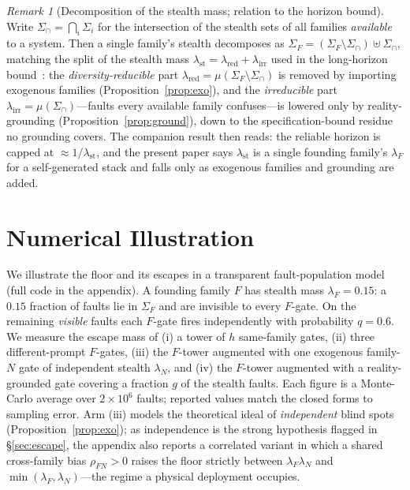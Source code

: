 \documentclass[11pt]{article}
\theoremstyle{definition}
\theoremstyle{remark}
\newtheorem{remark}{Remark}
\newcommand{\SigF}{\Sigma_{F}}
\newcommand{\lF}{\lambda_{F}}
\newcommand{\lN}{\lambda_{N}}
\newcommand{\lst}{\lambda_{\mathrm{st}}}
\newcommand{\lred}{\lambda_{\mathrm{red}}}
\newcommand{\lirr}{\lambda_{\mathrm{irr}}}
\begin{document}
\begin{remark}[Decomposition of the stealth mass; relation to the horizon
bound]\label{rem:n1}
Write $\Sigma_{\cap}=\bigcap_i\Sigma_i$ for the intersection of the stealth sets of all families
\emph{available} to a system. Then a single family's stealth decomposes as
$\SigF=(\SigF\setminus\Sigma_{\cap})\uplus\Sigma_{\cap}$, matching the split of the stealth mass
$\lst=\lred+\lirr$ used in the long-horizon bound~\cite{matijasevic2026}: the
\emph{diversity-reducible} part $\lred=\mu(\SigF\setminus\Sigma_{\cap})$ is removed by importing
exogenous families (Proposition~\ref{prop:exo}), and the \emph{irreducible} part
$\lirr=\mu(\Sigma_{\cap})$---faults every available family confuses---is lowered only by
reality-grounding (Proposition~\ref{prop:ground}), down to the specification-bound residue no
grounding covers. The companion result then reads: the reliable horizon is capped at $\approx
1/\lst$, and the present paper says $\lst$ is a single founding family's $\lF$ for a self-generated
stack and falls only as exogenous families and grounding are added.
\end{remark}

\section{Numerical Illustration}\label{sec:num}
We illustrate the floor and its escapes in a transparent fault-population model (full code in the
appendix). A founding family $F$ has stealth mass $\lF=0.15$: a $0.15$ fraction of faults lie in
$\SigF$ and are invisible to every $F$-gate. On the remaining \emph{visible} faults each $F$-gate
fires independently with probability $q=0.6$. We measure the escape mass of (i) a tower of $h$
same-family gates, (ii) three different-prompt $F$-gates, (iii) the $F$-tower augmented with one
exogenous family-$N$ gate of independent stealth $\lN$, and (iv) the $F$-tower augmented with a
reality-grounded gate covering a fraction $g$ of the stealth faults. Each figure is a Monte-Carlo
average over $2\times10^{6}$ faults; reported values match the closed forms to sampling error. Arm
(iii) models the theoretical ideal of \emph{independent} blind spots (Proposition~\ref{prop:exo}); as
independence is the strong hypothesis flagged in \S\ref{sec:escape}, the appendix also reports a
correlated variant in which a shared cross-family bias $\rho_{FN}>0$ raises the floor strictly between
$\lF\lN$ and $\min(\lF,\lN)$---the regime a physical deployment occupies.
\end{document}
